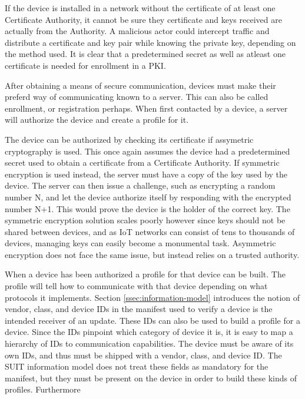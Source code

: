 \documentclass[0-thesis.tex]{subfiles}
\begin{document}
If the device is installed in a network without the certificate of at least one
Certificate Authority, it cannot be sure they certificate and keys received are actually
from the Authority. A malicious actor could intercept traffic and distribute a certificate
and key pair while knowing the private key, depending on the method used. It is clear that
a predetermined secret as well as atleast one certificate is needed for enrollment in a
PKI.

After obtaining a means of secure communication, devices must make their preferd way of
communicating known to a server. This can also be called enrollment, or registration
perhaps. When first contacted by a device, a server will authorize the device and create a
profile for it.

The device can be authorized by checking its certificate if assymetric cryptography is
used. This once again assumes the device had a predetermined secret used to obtain a
certificate from a Certificate Authority. If symmetric encryption is used instead, the
server must have a copy of the key used by the device. The server can then issue a
challenge, such as encrypting a random number N, and let the device authorize itself by
responding with the encrypted number N+1. This would prove the device is the holder of the
correct key. The symmetric encryption solution scales poorly however since keys should not
be shared between devices, and as IoT networks can consist of tens to thousands of
devices, managing keys can easily become a monumental task. Asymmetric encryption does not
face the same issue, but instead relies on a trusted authority.

When a device has been authorized a profile for that device can be built. The profile will
tell how to communicate with that device depending on what protocols it implements.
Section \ref{ssec:information-model} introduces the notion of vendor, class, and device
IDs in the manifest used to verify a device is the intended receiver of an update. These
IDs can also be used to build a profile for a device. Since the IDs pinpoint which
category of device it is, it is easy to map a hierarchy of IDs to communication
capabilities. The device must be aware of its own IDs, and thus must be shipped with a
vendor, class, and device ID. The SUIT information model does not treat these fields as
mandatory for the manifest, but they must be present on the device in order to build these
kinds of profiles. Furthermore
\end{document}
